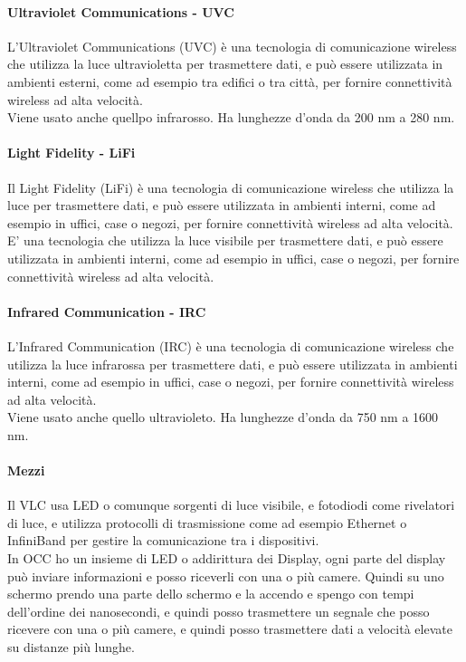 \paragraph{Ultraviolet Communications - UVC}
L'Ultraviolet Communications (UVC) è una tecnologia di comunicazione wireless che utilizza la luce ultravioletta per trasmettere dati, e può essere utilizzata in ambienti esterni, come ad esempio tra edifici o tra città, per fornire connettività wireless ad alta velocità.\\
Viene usato anche quellpo infrarosso. 
Ha lunghezze d'onda da 200 nm a 280 nm.

\paragraph{Light Fidelity - LiFi}
Il Light Fidelity (LiFi) è una tecnologia di comunicazione wireless che utilizza la luce per trasmettere dati, e può essere utilizzata in ambienti interni, come ad esempio in uffici, case o negozi, per fornire connettività wireless ad alta velocità.\\
E' una tecnologia che utilizza la luce visibile per trasmettere dati, e può essere utilizzata in ambienti interni, come ad esempio in uffici, case o negozi, per fornire connettività wireless ad alta velocità.\\
\paragraph{Infrared Communication - IRC}
L'Infrared Communication (IRC) è una tecnologia di comunicazione wireless che utilizza la luce infrarossa per trasmettere dati, e può essere utilizzata in ambienti interni, come ad esempio in uffici, case o negozi, per fornire connettività wireless ad alta velocità.\\
Viene usato anche quello ultravioleto.
Ha lunghezze d'onda da 750 nm a 1600 nm.

\paragraph{Mezzi}
Il VLC usa LED o comunque sorgenti di luce visibile, e fotodiodi come rivelatori di luce, e utilizza protocolli di trasmissione come ad esempio Ethernet o InfiniBand per gestire la comunicazione tra i dispositivi.\\

In OCC ho un insieme di LED o addirittura dei Display, ogni parte del display può inviare informazioni e posso riceverli con una o più camere. Quindi su uno schermo prendo una parte dello schermo e la accendo e spengo con tempi dell'ordine dei nanosecondi, e quindi posso trasmettere un segnale che posso ricevere con una o più camere, e quindi posso trasmettere dati a velocità elevate su distanze più lunghe.\\

